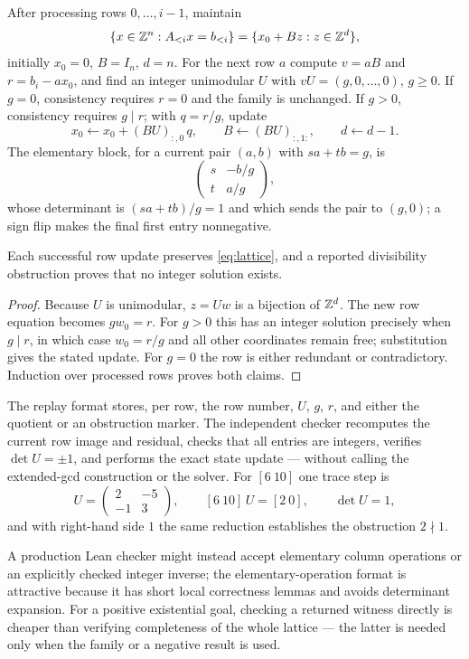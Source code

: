 After processing rows $0,\ldots,i-1$, maintain
\begin{equation}\label{eq:lattice}
\{x\in\mathbb{Z}^n:A_{<i}x=b_{<i}\}=\{x_0+Bz:z\in\mathbb{Z}^d\},
\end{equation}
initially $x_0=0$, $B=I_n$, $d=n$. For the next row $a$ compute $v=aB$ and
$r=b_i-ax_0$, and find an integer unimodular $U$ with
$vU=(g,0,\ldots,0)$, $g\ge0$. If $g=0$, consistency requires $r=0$ and the
family is unchanged. If $g>0$, consistency requires $g\mid r$; with $q=r/g$,
update
\[
x_0\leftarrow x_0+(BU)_{:,0}\,q,\qquad
B\leftarrow(BU)_{:,1:},\qquad d\leftarrow d-1 .
\]
The elementary block, for a current pair $(a,b)$ with $sa+tb=g$, is
\[
\begin{pmatrix}s&-b/g\\t&a/g\end{pmatrix},
\]
whose determinant is $(sa+tb)/g=1$ and which sends the pair to $(g,0)$; a sign
flip makes the final first entry nonnegative.

\begin{proposition}
\label{prop:lattice}
Each successful row update preserves \eqref{eq:lattice}, and a reported
divisibility obstruction proves that no integer solution exists.
\end{proposition}
\begin{proof}
Because $U$ is unimodular, $z=Uw$ is a bijection of $\mathbb{Z}^d$. The new row equation
becomes $gw_0=r$. For $g>0$ this has an integer solution precisely when
$g\mid r$, in which case $w_0=r/g$ and all other coordinates remain free;
substitution gives the stated update. For $g=0$ the row is either redundant or
contradictory. Induction over processed rows proves both claims.
\end{proof}

The replay format stores, per row, the row number, $U$, $g$, $r$, and either the
quotient or an obstruction marker. The independent checker recomputes the
current row image and residual, checks that all entries are integers, verifies
$\det U=\pm1$, and performs the exact state update --- without calling the
extended-gcd construction or the solver. For $[6\ 10]$ one trace step is
\[
U=\begin{pmatrix}2&-5\\-1&3\end{pmatrix},\qquad
[6\ 10]\,U=[2\ 0],\qquad \det U=1,
\]
and with right-hand side $1$ the same reduction establishes the obstruction
$2\nmid1$.

A production Lean checker might instead accept elementary column operations or
an explicitly checked integer inverse; the elementary-operation format is
attractive because it has short local correctness lemmas and avoids determinant
expansion. For a positive existential goal, checking a returned witness directly
is cheaper than verifying completeness of the whole lattice --- the latter is
needed only when the family or a negative result is used.


